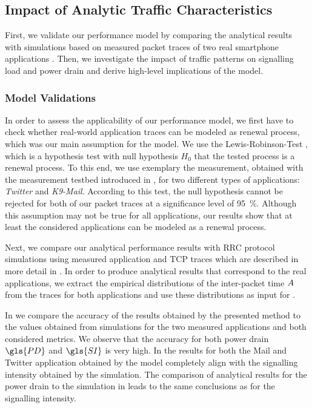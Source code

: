 \subsection{Impact of Analytic Traffic Characteristics}\label{sec:network:performance_model:numerical_examples}
First, we validate our performance model by comparing the analytical results with simulations based on measured
packet traces of two real smartphone applications .
Then, we investigate the impact of traffic patterns on signalling load and power drain and derive high-level implications of the model.

\subsubsection*{Model Validations}\label{sec:network:performance_model:validations}

In order to assess the applicability of our performance model, we first have to check whether real-world application traces can be modeled as renewal process, which was our main assumption for the model.
We use the Lewis-Robinson-Test \cite{Ascher1984}, which is a hypothesis test with null hypothesis \(H_0\) that the tested process is a renewal process.
To this end, we use exemplary the measurement, obtained with the measurement testbed introduced in , for two different types of applications: \emph{Twitter} and \emph{K9-Mail}.
According to this test, the null hypothesis cannot be rejected for both of our packet traces at a significance level of \SI{95}{\percent}.
Although this assumption may not be true for all applications, our results show that at least the considered applications can be modeled as a renewal process.

Next, we compare our analytical performance results with \gls{RRC} protocol simulations using measured application and \gls{TCP} traces which are described in more detail in .
In order to produce analytical results that correspond to the real applications, we extract the empirical distributions of the inter-packet time \(A\) from the traces for both applications and use these distributions as input for . 

In  we compare the accuracy of the results  obtained by the presented method to the values obtained from simulations for the two measured applications and both considered metrics.
We observe that the accuracy for both power drain \(\gls{PD}\) and \(\gls{SI}\) is very high.
In  the results for both the Mail and Twitter application obtained by the model completely align with the signalling intensity obtained by the simulation.
The comparison of analytical results for the power drain to the simulation in  leads to the same conclusions as for the signalling intensity.

